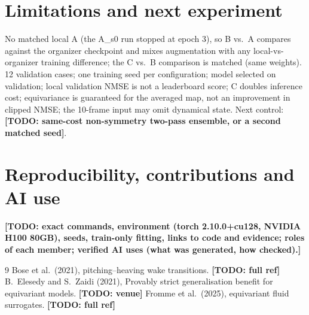 \documentclass[11pt]{article}
\newcommand{\todo}[1]{\textbf{[TODO: #1]}}
\begin{document}
\section{Limitations and next experiment}
No matched local A (the A\_s0 run stopped at epoch 3), so B vs.\ A compares against the organizer
checkpoint and mixes augmentation with any local-vs-organizer training difference; the C vs.\ B comparison
is matched (same weights). 12 validation cases; one training seed per configuration; model selected on
validation; local validation NMSE is not a leaderboard score; C doubles
inference cost; equivariance is guaranteed for the averaged map, not an improvement in clipped NMSE;
the 10-frame input may omit dynamical state. Next control: \todo{same-cost non-symmetry two-pass
ensemble, or a second matched seed}.

\section{Reproducibility, contributions and AI use}
\todo{exact commands, environment (torch 2.10.0+cu128, NVIDIA H100 80GB), seeds, train-only fitting,
links to code and evidence; roles of each member; verified AI uses (what was generated, how checked).}

\clearpage
\begin{thebibliography}{9}\small
{} Bose et al.\ (2021), pitching--heaving wake transitions. \todo{full ref}
 B.~Elesedy and S.~Zaidi (2021), Provably strict generalisation benefit for equivariant models. \todo{venue}
 Fromme et al.\ (2025), equivariant fluid surrogates. \todo{full ref}
\end{thebibliography}
\end{document}
